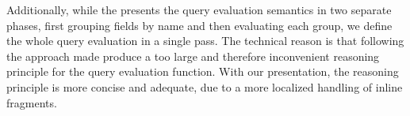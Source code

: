 Additionally, while the \spec presents the query evaluation semantics in two separate phases, first grouping fields by name and then evaluating each group, we define the whole query evaluation in a single pass. The technical reason is that following the \spec approach made \equations produce a too large and therefore inconvenient reasoning principle for the query evaluation function. With our presentation, the reasoning principle is more concise and adequate, due to a more localized handling of inline fragments.







